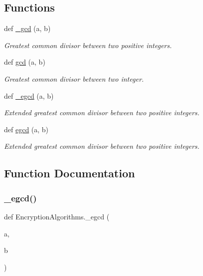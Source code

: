 \subsection*{Functions}
\begin{DoxyCompactItemize}
\item 
def \mbox{\hyperlink{namespaceEncryptionAlgorithms_a579c44082c46469c685af4fa13b7087e}{\+\_\+gcd}} (a, b)
\begin{DoxyCompactList}\small\item\em Greatest common divisor between two positive integers. \end{DoxyCompactList}\item 
def \mbox{\hyperlink{namespaceEncryptionAlgorithms_ac6020cd3bf4adee2c1d7e325d0218630}{gcd}} (a, b)
\begin{DoxyCompactList}\small\item\em Greatest common divisor between two integer. \end{DoxyCompactList}\item 
def \mbox{\hyperlink{namespaceEncryptionAlgorithms_a054a518c18879771f989654ab7e2ae4e}{\+\_\+egcd}} (a, b)
\begin{DoxyCompactList}\small\item\em Extended greatest common divisor between two positive integers. \end{DoxyCompactList}\item 
def \mbox{\hyperlink{namespaceEncryptionAlgorithms_a8202b546cf0698eece91364d04351eac}{egcd}} (a, b)
\begin{DoxyCompactList}\small\item\em Extended greatest common divisor between two positive integers. \end{DoxyCompactList}\end{DoxyCompactItemize}


\subsection{Function Documentation}
\mbox{\label{namespaceEncryptionAlgorithms_a054a518c18879771f989654ab7e2ae4e}} 
\subsubsection{\texorpdfstring{\+\_\+egcd()}{\_egcd()}}
{\footnotesize\ttfamily def Encryption\+Algorithms.\+\_\+egcd (\begin{DoxyParamCaption}\item[{}]{a,  }\item[{}]{b }\end{DoxyParamCaption})\hspace{0.3cm}{\ttfamily [private]}}



